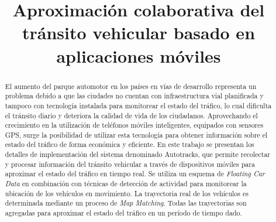\documentclass[conference,spanish]{IEEEtran}
\begin{document}
  \renewcommand{\lstlistingname}{\textbf{Consulta}}
  \renewcommand\tablename{Tabla}
  
	\title{Aproximación colaborativa del tránsito vehicular basado en aplicaciones móviles}
	
	\author{
		\and
		\and
		}

	\maketitle
	
	\begin{abstract}
El aumento del parque automotor en los países en vías de desarrollo representa un problema debido a que las ciudades no cuentan con infraestructura vial planificada y tampoco con tecnología instalada para monitorear el estado del tráfico, lo cual dificulta el tránsito diario y deteriora la calidad de vida de los ciudadanos. Aprovechando el crecimiento en la utilización de teléfonos móviles inteligentes, equipados con sensores GPS, surge la posibilidad de utilizar esta tecnología para obtener información sobre el estado del tráfico de forma económica y eficiente. En este trabajo se presentan los detalles de implementación del sistema denominado Autotracks, que permite recolectar y procesar información del tránsito vehicular a través de dispositivos móviles para aproximar el estado del tráfico en tiempo real. Se utiliza un esquema de \emph{Floating Car Data} en combinación con técnicas de detección de actividad para monitorear la ubicación de los vehículos en movimiento. La trayectoria real de los vehículos es determinada mediante un proceso de \emph{Map Matching}. Todas las trayectorias son agregadas para aproximar el estado del tráfico en un período de tiempo dado.
	\end{abstract}
	
\end{document}

